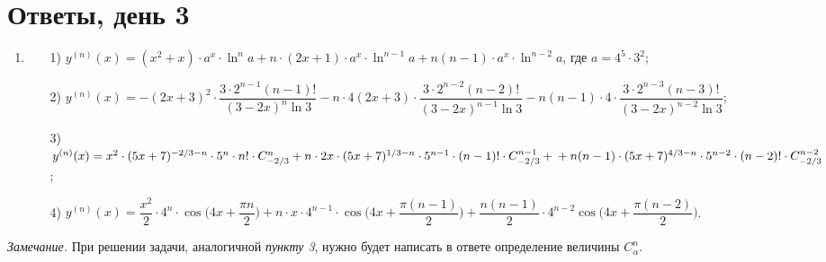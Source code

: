 \documentclass[a4paper,12pt]{article}
\begin{document}
\section*{Ответы, день 3}

\begin{enumerate}
     	\item 
     	\begin{enumerate}
     		\item[1)] $y^{(n)} (x) = (x^2 + x) \cdot a^x \cdot \ln^n a + n \cdot (2x + 1) \cdot a^x \cdot \ln^{n - 1} a + n(n - 1) \cdot a^x \cdot \ln^{n - 2} a$, где $a = 4^5 \cdot 3^2$;
     		\item[2)] $y^{(n)} (x) = -(2x + 3)^2 \cdot \dfrac{3 \cdot 2^{n - 1} (n - 1)!}{(3 - 2x)^n \ln{3}} - n \cdot 4(2x + 3) \cdot \dfrac{3 \cdot 2^{n - 2} (n - 2)!}{(3 - 2x)^{n-1} \ln{3}} - n(n - 1) \cdot 4 \cdot \dfrac{3 \cdot 2^{n - 3} (n - 3)!}{(3 - 2x)^{n-2} \ln{3}}$;
     		\item[3)] $y^{(n)} (x) = x^2 \cdot (5x + 7)^{-2/3 - n} \cdot 5^n \cdot n! \cdot C_{-2/3}^n + n \cdot 2x \cdot (5x + 7)^{1/3 - n} \cdot 5^{n-1} \cdot (n - 1)! \cdot C_{-2/3}^{n - 1} + \\ + n(n - 1) \cdot (5x + 7)^{4/3 - n} \cdot 5^{n-2} \cdot (n - 2)! \cdot C_{-2/3}^{n - 2}$;
     		\item[4)] $y^{(n)} (x) = \dfrac{x^2}{2} \cdot 4^n \cdot \cos \bigg( 4x + \dfrac{\pi n}{2} \bigg) + n \cdot x \cdot 4^{n-1} \cdot \cos \bigg( 4x + \dfrac{\pi (n - 1)}{2} \bigg) + \dfrac{n(n - 1)}{2} \cdot 4^{n - 2} \cos \bigg( 4x + \dfrac{\pi (n - 2)}{2} \bigg) $.
     	\end{enumerate} 
     	     	
\end{enumerate}

\textit{ Замечание.} При решении задачи, аналогичной \textit{пункту 3}, нужно будет написать в ответе определение величины $C_{\alpha} ^n$. 
\end{document}
